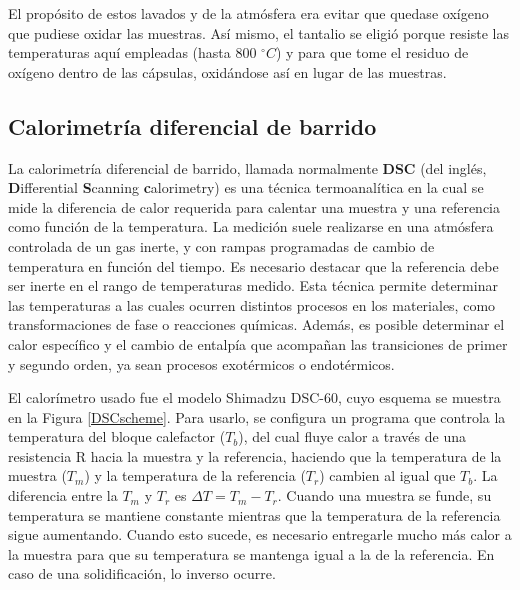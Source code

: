 \documentclass[12pt]{article}
\theoremstyle{definition}
\theoremstyle{remark}
\begin{document}
{El propósito de estos lavados y de la atmósfera era evitar que quedase oxígeno que pudiese oxidar las muestras. Así mismo, el tantalio se eligió porque resiste las temperaturas aquí empleadas (hasta 800 $^\circ C$) y para que tome el residuo de oxígeno dentro de las cápsulas, oxidándose así en lugar de las muestras.

\subsection{Calorimetría diferencial de barrido}

La calorimetría diferencial de barrido, llamada normalmente \textbf{DSC} (del inglés, \textbf{D}ifferential \textbf{S}canning \textbf{c}alorimetry) es una técnica termoanalítica en la cual se mide la diferencia de calor requerida para calentar una muestra y una referencia como función de la temperatura. La medición suele realizarse en una atmósfera controlada de un gas inerte, y con rampas programadas de cambio de temperatura en función del tiempo.  Es necesario destacar que la referencia debe ser inerte en el rango de temperaturas medido.
Esta técnica permite determinar las temperaturas a las cuales ocurren distintos procesos en los materiales, como transformaciones de fase o reacciones químicas. Además, es posible determinar el calor específico y el cambio de entalpía que acompañan las transiciones de primer y segundo orden, ya sean procesos exotérmicos o endotérmicos.

El calorímetro usado fue el modelo Shimadzu DSC-60, cuyo esquema se muestra en la Figura \ref{DSCscheme}. Para usarlo, se configura un programa que controla la temperatura del bloque calefactor ($T_b$), del cual fluye calor a través de una resistencia R hacia la muestra y la referencia, haciendo que la temperatura de la muestra ($T_m$) y la temperatura de la referencia ($T_r$) cambien al igual que $T_b$. La diferencia entre la $T_m$ y $T_r$ es $\Delta T = T_m - T_r$. Cuando una muestra se funde, su temperatura se mantiene constante mientras que la temperatura de la referencia sigue aumentando. Cuando esto sucede, es necesario entregarle mucho más calor a la muestra para que su temperatura se mantenga igual a la de la referencia. En caso de una solidificación, lo inverso ocurre.

}
\end{document}
